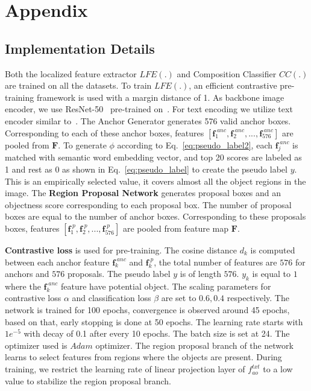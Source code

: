 \documentclass{bmvc2k}
\begin{document}


\section{Appendix}

\subsection{Implementation Details}

Both the localized feature extractor $LFE(.)$ and Composition Classifier $CC(.)$ are trained on all the datasets. To train $LFE(.)$, an efficient contrastive pre-training framework is used with a margin distance of 1. As backbone image encoder, we use ResNet-50~\cite{he2016deep} pre-trained on~\cite{radford2021learning}. For text encoding we utilize text encoder similar to~\cite{radford2021learning}. The Anchor Generator generates 576 valid anchor boxes. Corresponding to each of these anchor boxes, features $[\textbf{f}^{\;anc}_1, \textbf{f}^{\;anc}_2, ..., \textbf{f}^{\;anc}_{576}]$ are pooled from $\textbf{F}$. To generate $\phi$ according to Eq.~\ref{eq:pseudo_label2}, each $\textbf{f}^{\;anc}_j$ is matched with semantic word embedding vector, and top 20 scores are labeled as 1 and rest as 0 as shown in Eq.~\ref{eq:pseudo_label} to create the pseudo label $y$. This is an empirically selected value, it covers almost all the object regions in the image. The \textbf{Region Proposal Network} generates proposal boxes and an objectness score corresponding to each proposal box. The number of proposal boxes are equal to the number of anchor boxes. Corresponding to these proposals boxes, features $[\textbf{f}^{\;p}_1, \textbf{f}^{\;p}_2, ..., \textbf{f}^{\;p}_{576}]$ are pooled from feature map $\textbf{F}$.

\textbf{Contrastive loss} is used for pre-training. The cosine distance $d_k$ is computed between each anchor feature $\textbf{f}^{\;anc}_k$ and $\textbf{f}^{\;p}_k$, the total number of features are $576$ for anchors and $576$ proposals. The pseudo label $y$ is of length $576$. $y_k$ is equal to $1$ where the $\textbf{f}^{\;anc}_k$ feature have potential object.
The scaling parameters for contrastive loss $\alpha$ and classification loss $\beta$ are set to $0.6, 0.4$ respectively. The network is trained for 100 epochs, convergence is observed around 45 epochs, based on that, early stopping is done at 50 epochs. The learning rate starts with $1e^{-5}$ with decay of 0.1 after every 10 epochs. The batch size is set at 24. The optimizer used is $Adam$ optimizer. The region proposal branch of the network learns to select features from regions where the objects are present. During training, we restrict the learning rate of linear projection layer of $f^{txt}_{ao}$ to a low value to stabilize the region proposal branch.
\end{document}
